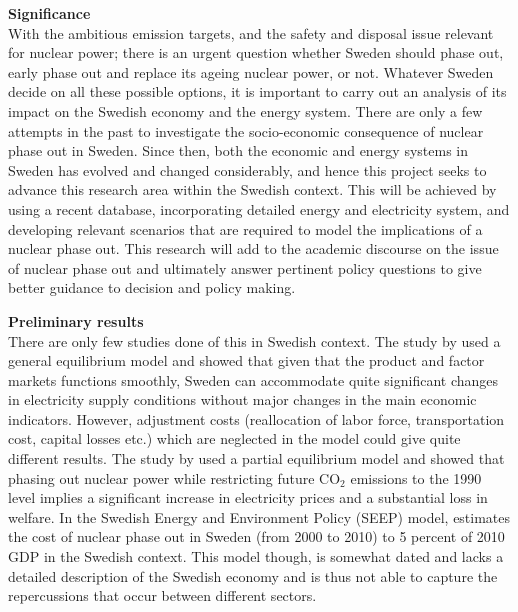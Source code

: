 
\textbf{Significance}\\
With the ambitious emission targets, and the safety and disposal issue relevant for nuclear power; there is an urgent question whether Sweden should phase out, early phase out and replace its ageing nuclear power, or not. Whatever Sweden decide on all these possible options, it is important to carry out an analysis of its impact on the Swedish economy and the energy system. There are only a few attempts in the past to investigate the socio-economic consequence of nuclear phase out in Sweden. Since then, both the economic and energy systems in Sweden has evolved and changed considerably, and hence this project seeks to advance this research area within the Swedish context. This will be achieved by using a recent database, incorporating detailed energy and electricity system, and developing relevant scenarios that are required to model the implications of a nuclear phase out. This research will add to the academic discourse on the issue of nuclear phase out and ultimately answer pertinent policy questions to give better guidance to decision and policy making.

\textbf{Preliminary results}\\
There are only few studies done of this in Swedish context. The study by \cite{Bergman1981} used a general equilibrium model and showed that given that the product and factor markets functions smoothly, Sweden can accommodate quite significant changes in electricity supply conditions without major changes in the main economic indicators. However, adjustment costs (reallocation of labor force, transportation cost, capital losses etc.) which are neglected in the model could give quite different results. The study by \cite{Andersson1997} used a partial equilibrium model and showed that phasing out nuclear power while restricting future CO$_2$ emissions to the 1990 level implies a significant increase in electricity prices and a substantial loss in welfare. In the Swedish Energy and Environment Policy (SEEP) model, \cite{nordhaus1997swedish} estimates the cost of nuclear phase out in Sweden (from 2000 to 2010) to 5 percent of 2010 GDP in the Swedish context. This model though, is somewhat dated and lacks a detailed description of the Swedish economy and is thus not able to capture the repercussions that occur between different sectors.

